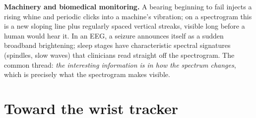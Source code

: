 \begin{applicationbox}
\textbf{Machinery and biomedical monitoring.} A bearing beginning to fail injects
a rising whine and periodic clicks into a machine's vibration; on a spectrogram
this is a new sloping line plus regularly spaced vertical streaks, visible long
before a human would hear it. In an EEG, a seizure announces itself as a sudden
broadband brightening; sleep stages have characteristic spectral signatures
(spindles, slow waves) that clinicians read straight off the spectrogram. The
common thread: \emph{the interesting information is in how the spectrum changes},
which is precisely what the spectrogram makes visible.
\end{applicationbox}

\section{Toward the wrist tracker}
\label{ch10:wrist}

